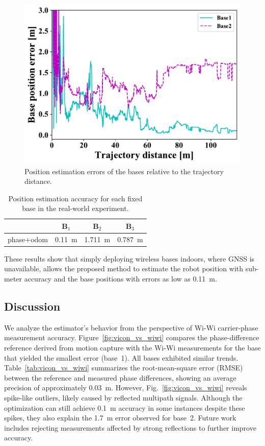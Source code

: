 \documentclass[conference]{IEEEtran}
\begin{document}
\begin{figure}
    \centering
    \includegraphics[width=0.95\linewidth]{figures/robosym_online_base_position_error.pdf}
    \caption{Position estimation errors of the bases relative to the trajectory distance.}
    \label{fig:error_base}
\end{figure}

\begin{table}
    \centering
    \caption{Position estimation accuracy for each fixed base in the real-world experiment.}
    \begin{tabular}{|c|c|c|c|}
    \hline
    & $\mathbf{B}_1$ & $\mathbf{B}_2$ & $\mathbf{B}_3$ \\
    \hline
    phase+odom & 0.11~m & 1.711~m & 0.787~m \\
    \hline
    \end{tabular}
    \label{tab:base_error_real}
\end{table}

These results show that simply deploying wireless bases indoors, where GNSS is unavailable, allows the proposed method to estimate the robot position with sub-meter accuracy and the base positions with errors as low as 0.11~m.

\subsection{Discussion}
We analyze the estimator's behavior from the perspective of Wi-Wi carrier-phase measurement accuracy.
Figure~\ref{fig:vicon_vs_wiwi} compares the phase-difference reference derived from motion capture with the Wi-Wi measurements for the base that yielded the smallest error (base~1).
All bases exhibited similar trends.
Table~\ref{tab:vicon_vs_wiwi} summarizes the root-mean-square error (RMSE) between the reference and measured phase differences, showing an average precision of approximately 0.03~m.
However, Fig.~\ref{fig:vicon_vs_wiwi} reveals spike-like outliers, likely caused by reflected multipath signals.
Although the optimization can still achieve 0.1~m accuracy in some instances despite these spikes, they also explain the 1.7~m error observed for base~2.
Future work includes rejecting measurements affected by strong reflections to further improve accuracy.
\end{document}
